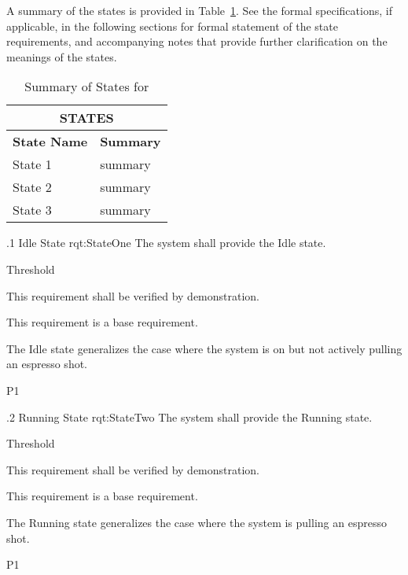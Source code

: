 A summary of the states is provided in Table~\ref{tab:States}.
See the formal specifications, if applicable, in the following sections for formal statement of the state requirements, and accompanying notes that provide further clarification on the meanings of the states.

\begin{table}[h]
	\begin{center}
		\begin{tabular}{|p{1.0in}|p{5.0in}|}
			\hline
			\hline
			\multicolumn{2}{|c|}{{\bf STATES}} \\
			\hline
				{\bf State Name} & {\bf Summary} \\
			\hline
			\hline
State 1 & summary \\ \hline
State 2 & summary \\ \hline
State 3 & summary \\ 
			\hline
			\hline
		\end{tabular}
		\caption{Summary of States for \ThisSystem}
		\label{tab:States}
	\end{center}
\end{table}


\ONERQMTV
{\RqtNumberBase.1}
{Idle State}
{rqt:StateOne}
{The system shall provide the Idle state.}
{
	\item [Phase 1] Threshold
}
{This requirement shall be verified by demonstration.}
{
	\item [N/A] This requirement is a base requirement.
}
{
	\item The Idle state generalizes the case where the system is on but not actively pulling an espresso shot. 
}
{P1}


\ONERQMTV
{\RqtNumberBase.2}
{Running State}
{rqt:StateTwo}
{The system shall provide the Running state.}
{
	\item [Phase 1] Threshold
}
{This requirement shall be verified by demonstration.}
{
	\item [N/A] This requirement is a base requirement.
}
{
	\item The Running state generalizes the case where the system is pulling an espresso shot.
}
{P1}


